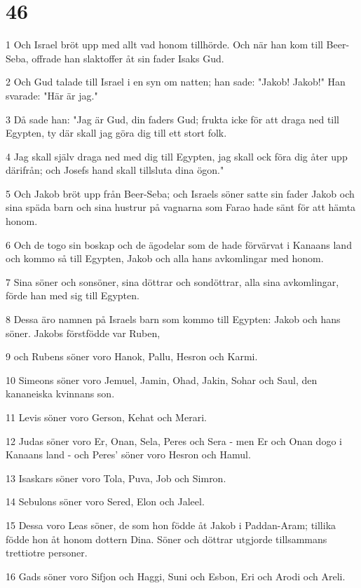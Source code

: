 \chapter{46}

\par 1 Och Israel bröt upp med allt vad honom tillhörde. Och när han kom till Beer-Seba, offrade han slaktoffer åt sin fader Isaks Gud.
\par 2 Och Gud talade till Israel i en syn om natten; han sade: "Jakob! Jakob!" Han svarade: "Här är jag."
\par 3 Då sade han: "Jag är Gud, din faders Gud; frukta icke för att draga ned till Egypten, ty där skall jag göra dig till ett stort folk.
\par 4 Jag skall själv draga ned med dig till Egypten, jag skall ock föra dig åter upp därifrån; och Josefs hand skall tillsluta dina ögon."
\par 5 Och Jakob bröt upp från Beer-Seba; och Israels söner satte sin fader Jakob och sina späda barn och sina hustrur på vagnarna som Farao hade sänt för att hämta honom.
\par 6 Och de togo sin boskap och de ägodelar som de hade förvärvat i Kanaans land och kommo så till Egypten, Jakob och alla hans avkomlingar med honom.
\par 7 Sina söner och sonsöner, sina döttrar och sondöttrar, alla sina avkomlingar, förde han med sig till Egypten.
\par 8 Dessa äro namnen på Israels barn som kommo till Egypten: Jakob och hans söner. Jakobs förstfödde var Ruben,
\par 9 och Rubens söner voro Hanok, Pallu, Hesron och Karmi.
\par 10 Simeons söner voro Jemuel, Jamin, Ohad, Jakin, Sohar och Saul, den kananeiska kvinnans son.
\par 11 Levis söner voro Gerson, Kehat och Merari.
\par 12 Judas söner voro Er, Onan, Sela, Peres och Sera - men Er och Onan dogo i Kanaans land - och Peres' söner voro Hesron och Hamul.
\par 13 Isaskars söner voro Tola, Puva, Job och Simron.
\par 14 Sebulons söner voro Sered, Elon och Jaleel.
\par 15 Dessa voro Leas söner, de som hon födde åt Jakob i Paddan-Aram; tillika födde hon åt honom dottern Dina. Söner och döttrar utgjorde tillsammans trettiotre personer.
\par 16 Gads söner voro Sifjon och Haggi, Suni och Esbon, Eri och Arodi och Areli.
